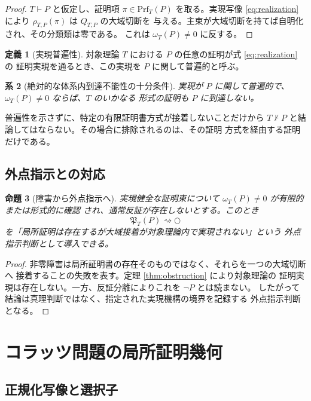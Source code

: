 \documentclass[a4paper,11pt]{ltjsarticle}
\theoremstyle{definition}
\newtheorem{definition}{定義}[section]
\theoremstyle{plain}
\newtheorem{proposition}[definition]{命題}
\newtheorem{corollary}[definition]{系}
\newcommand{\dfix}{\mathord{\text{○}}}
\newcommand{\Prf}{\mathrm{Prf}}
\newcommand{\1}{\mathbf{1}}
\begin{document}
\begin{proof}
$T\vdash P$ と仮定し、証明項 $\pi\in\Prf_T(P)$ を取る。実現写像
\eqref{eq:realization} により $\rho_{T,P}(\pi)$ は $Q_{T,P}$ の大域切断を
与える。主束が大域切断を持てば自明化され、その分類類は零である。
これは $\omega_T(P)\ne0$ に反する。
\end{proof}

\begin{definition}[実現普遍性]
対象理論 $T$ における $P$ の任意の証明が式 \eqref{eq:realization} の
証明実現を通るとき、この実現を $P$ に関して普遍的と呼ぶ。
\end{definition}

\begin{corollary}[絶対的な体系内到達不能性の十分条件]
実現が $P$ に関して普遍的で、$\omega_T(P)\ne0$ ならば、$T$ のいかなる
形式の証明も $P$ に到達しない。
\end{corollary}

普遍性を示さずに、特定の有限証明書方式が接着しないことだけから
$T\nvdash P$ と結論してはならない。その場合に排除されるのは、その証明
方式を経由する証明だけである。

\subsection{外点指示との対応}

\begin{proposition}[障害から外点指示へ]
実現健全な証明束について $\omega_T(P)\ne0$ が有限的または形式的に確認
され、通常反証が存在しないとする。このとき
\[
 \mathfrak P_T(P)\rightsquigarrow\dfix
\]
を「局所証明は存在するが大域接着が対象理論内で実現されない」という
外点指示判断として導入できる。
\end{proposition}

\begin{proof}
非零障害は局所証明書の存在そのものではなく、それらを一つの大域切断へ
接着することの失敗を表す。定理 \ref{thm:obstruction} により対象理論の
証明実現は存在しない。一方、反証分離によりこれを $\neg P$ とは読まない。
したがって結論は真理判断ではなく、指定された実現機構の境界を記録する
外点指示判断となる。
\end{proof}

\section{コラッツ問題の局所証明幾何}

\subsection{正規化写像と選択子}
\end{document}
